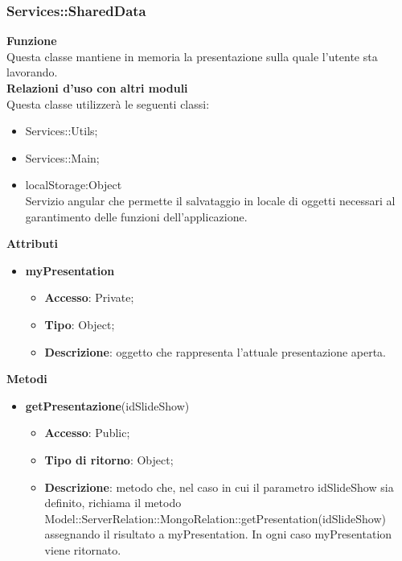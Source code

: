\subsubsection{Services::SharedData}{
		\label{sub:servicesSharedData}
		\textbf{Funzione}\\
		\indent Questa classe mantiene in memoria la presentazione sulla quale l'utente sta lavorando.\\
		\textbf{Relazioni d'uso con altri moduli}\\
		\indent Questa classe utilizzerà le seguenti classi:
		\begin{itemize}
			\item Services::Utils;
			\item Services::Main;
			\item localStorage:Object\\
				\indent Servizio angular che permette il salvataggio in locale di oggetti necessari al garantimento delle funzioni dell'applicazione.
		\end{itemize}
		\textbf{Attributi}\\
		\begin{itemize}
			\item \textbf{myPresentation}
			\begin{itemize}
				\item \textbf{Accesso}: Private;
				\item \textbf{Tipo}: Object;
				\item \textbf{Descrizione}: oggetto che rappresenta l'attuale presentazione aperta.
			\end{itemize}
		\end{itemize}
		\textbf{Metodi}
		\begin{itemize}
			\item \textbf{getPresentazione}(idSlideShow)
			\begin{itemize}
				\item \textbf{Accesso}: Public;
				\item \textbf{Tipo di ritorno}: Object;
				\item \textbf{Descrizione}: metodo che, nel caso in cui il parametro idSlideShow sia definito, richiama il metodo Model::\-ServerRelation::\-MongoRelation::\-getPresentation(idSlideShow) assegnando il risultato a myPresentation. In ogni caso myPresentation viene ritornato.
			\end{itemize}
		\end{itemize}
}
